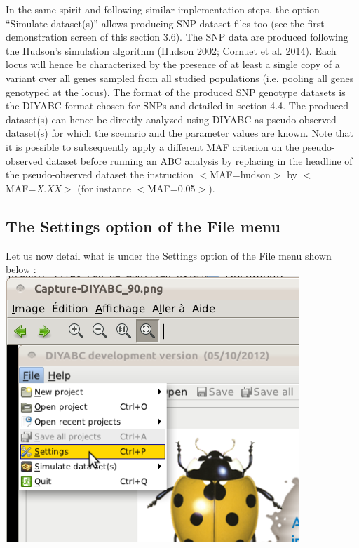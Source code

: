 In the same spirit and following similar implementation steps, the
option ``Simulate dataset(s)'' allows producing SNP dataset files
too (see the first demonstration screen of this section 3.6). The
SNP data are produced following the Hudson\textquoteright{}s simulation
algorithm (Hudson 2002; Cornuet et al. 2014). Each locus will hence
be characterized by the presence of at least a single copy of a variant
over all genes sampled from all studied populations (i.e. pooling
all genes genotyped at the locus). The format of the produced SNP
genotype datasets is the DIYABC format chosen for SNPs and detailed
in section 4.4. The produced dataset(s) can hence be directly analyzed
using DIYABC as pseudo-observed dataset(s) for which the scenario
and the parameter values are known. Note that it is possible to subsequently
apply a different MAF criterion on the pseudo-observed dataset before
running an ABC analysis by replacing in the headline of the pseudo-observed
dataset the instruction \textsf{$<$MAF=hudson$>$} by \textsf{$<$MAF=}\textsf{\textit{X.XX}}\textsf{$>$}
(for instance \textsf{$<$MAF=0.05$>$}).


\subsection{The \textsf{Settings} option of the \textsf{File} menu}

Let us now detail what is under the \textsf{Settings} option of the
\textsf{File} menu shown below :\\


\includegraphics[scale=0.33]{gui_pictures/Capture-DIYABC-91} \\


